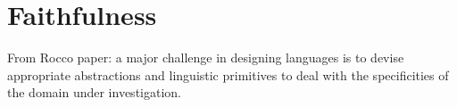 \section{Faithfulness} \label{sec::Faithfulness}
From Rocco paper: a major challenge in designing languages is to devise appropriate abstractions and linguistic primitives to deal with the specificities of the domain under investigation.